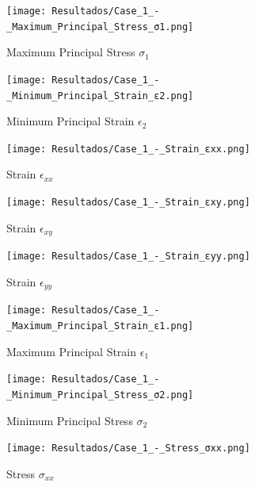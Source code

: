 \documentclass[12pt]{article}
\begin{document}
\begin{figure}[H]
    \centering
    \begin{minipage}{0.48\textwidth}
        \centering
        \texttt{[image: Resultados/Case\_1\_-\_Maximum\_Principal\_Stress\_σ1.png]}
        \caption{Maximum Principal Stress $\sigma_1$}
        \label{fig:fig2}
    \end{minipage}
    \hfill
    \begin{minipage}{0.48\textwidth}
        \centering
        \texttt{[image: Resultados/Case\_1\_-\_Minimum\_Principal\_Strain\_ε2.png]}
        \caption{Minimum Principal Strain $\epsilon_2$}
        \label{fig:fig3}
    \end{minipage}
\end{figure}

\begin{figure}[H]
    \centering
    \begin{minipage}{0.48\textwidth}
        \centering
        \texttt{[image: Resultados/Case\_1\_-\_Strain\_εxx.png]}
        \caption{Strain $\epsilon_{xx}$}
        \label{fig:fig4}
    \end{minipage}
    \hfill
    \begin{minipage}{0.48\textwidth}
        \centering
        \texttt{[image: Resultados/Case\_1\_-\_Strain\_εxy.png]}
        \caption{Strain $\epsilon_{xy}$}
        \label{fig:fig5}
    \end{minipage}
\end{figure}

\begin{figure}[H]
    \centering
    \begin{minipage}{0.48\textwidth}
        \centering
        \texttt{[image: Resultados/Case\_1\_-\_Strain\_εyy.png]}
        \caption{Strain $\epsilon_{yy}$}
        \label{fig:fig6}
    \end{minipage}
    \hfill
    \begin{minipage}{0.48\textwidth}
        \centering
        \texttt{[image: Resultados/Case\_1\_-\_Maximum\_Principal\_Strain\_ε1.png]}
        \caption{Maximum Principal Strain $\epsilon_1$}
        \label{fig:fig7}
    \end{minipage}
\end{figure}

\begin{figure}[H]
    \centering
    \begin{minipage}{0.48\textwidth}
        \centering
        \texttt{[image: Resultados/Case\_1\_-\_Minimum\_Principal\_Stress\_σ2.png]}
        \caption{Minimum Principal Stress $\sigma_2$}
        \label{fig:fig8}
    \end{minipage}
    \hfill
    \begin{minipage}{0.48\textwidth}
        \centering
        \texttt{[image: Resultados/Case\_1\_-\_Stress\_σxx.png]}
        \caption{Stress $\sigma_{xx}$}
        \label{fig:fig9}
    \end{minipage}
\end{figure}
\end{document}
